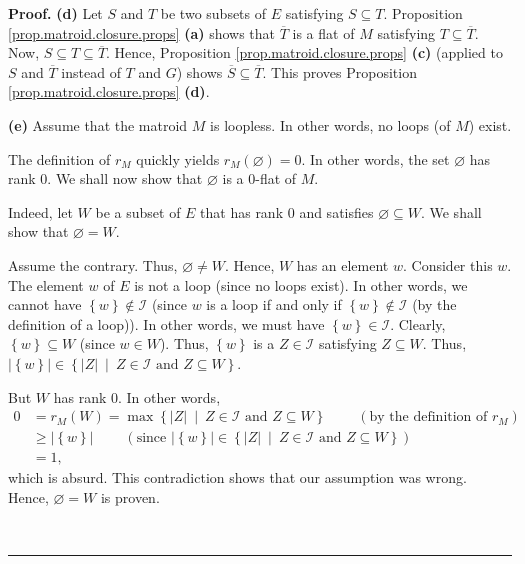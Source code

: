 \documentclass[numbers=enddot,12pt,final,onecolumn,notitlepage]{scrartcl}%
\theoremstyle{definition}
\newenvironment{proof}[1][Proof]{\noindent\textbf{#1.} }{\ \rule{0.5em}{0.5em}}
\begin{document}
\begin{proof}
\textbf{(d)} Let $S$ and $T$ be two subsets of $E$ satisfying $S\subseteq T$.
Proposition \ref{prop.matroid.closure.props} \textbf{(a)} shows that
$\overline{T}$ is a flat of $M$ satisfying $T\subseteq\overline{T}$. Now,
$S\subseteq T\subseteq\overline{T}$. Hence, Proposition
\ref{prop.matroid.closure.props} \textbf{(c)} (applied to $S$ and
$\overline{T}$ instead of $T$ and $G$) shows $\overline{S}\subseteq
\overline{T}$. This proves Proposition \ref{prop.matroid.closure.props}
\textbf{(d)}.

\textbf{(e)} Assume that the matroid $M$ is loopless. In other words, no loops
(of $M$) exist.

The definition of $r_{M}$ quickly yields $r_{M}\left(  \varnothing\right)
=0$. In other words, the set $\varnothing$ has rank $0$. We shall now show
that $\varnothing$ is a $0$-flat of $M$.

Indeed, let $W$ be a subset of $E$ that has rank $0$ and satisfies
$\varnothing\subseteq W$. We shall show that $\varnothing=W$.

Assume the contrary. Thus, $\varnothing\neq W$. Hence, $W$ has an element $w$.
Consider this $w$. The element $w$ of $E$ is not a loop (since no loops
exist). In other words, we cannot have $\left\{  w\right\}  \notin\mathcal{I}$
(since $w$ is a loop if and only if $\left\{  w\right\}  \notin\mathcal{I}$
(by the definition of a loop)). In other words, we must have $\left\{
w\right\}  \in\mathcal{I}$. Clearly, $\left\{  w\right\}  \subseteq W$ (since
$w\in W$). Thus, $\left\{  w\right\}  $ is a $Z\in\mathcal{I}$ satisfying
$Z\subseteq W$. Thus, $\left\vert \left\{  w\right\}  \right\vert \in\left\{
\left\vert Z\right\vert \ \mid\ Z\in\mathcal{I}\text{ and }Z\subseteq
W\right\}  $.

But $W$ has rank $0$. In other words,%
\begin{align*}
0  &  =r_{M}\left(  W\right)  =\max\left\{  \left\vert Z\right\vert
\ \mid\ Z\in\mathcal{I}\text{ and }Z\subseteq W\right\}
\ \ \ \ \ \ \ \ \ \ \left(  \text{by the definition of }r_{M}\right) \\
&  \geq\left\vert \left\{  w\right\}  \right\vert \ \ \ \ \ \ \ \ \ \ \left(
\text{since }\left\vert \left\{  w\right\}  \right\vert \in\left\{  \left\vert
Z\right\vert \ \mid\ Z\in\mathcal{I}\text{ and }Z\subseteq W\right\}  \right)
\\
&  =1,
\end{align*}
which is absurd. This contradiction shows that our assumption was wrong.
Hence, $\varnothing=W$ is proven.


\end{proof}
\end{document}
